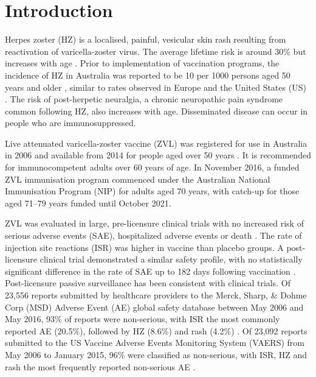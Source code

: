 \documentclass[review, endfloat]{elsarticle}
\begin{document}
\section{Introduction}

Herpes zoster (HZ) is a localised, painful, vesicular skin rash resulting from reactivation of varicella-zoster virus. The average lifetime risk is around 30\% but increases with age \citep{brisson2001epidemiology}. Prior to implementation of vaccination programs, the incidence of HZ in Australia was reported to be 10 per 1000 persons aged 50 years and older \citep{stein2009herpes}, similar to rates observed in Europe \citep{pinchinat2013similar} and the United States (US) \citep{insinga2005incidence}. The risk of post-herpetic neuralgia, a chronic neuropathic pain syndrome common following HZ, also increases with age. Disseminated disease can occur in people who are immunosuppressed. 

Live attenuated varicella-zoster vaccine (ZVL) was registered for use in Australia in 2006 and available from 2014 for people aged over 50 years \citep{yawn2007population}. It is recommended for immunocompetent adults over 60 years of age. In November 2016, a funded ZVL immunisation program commenced under the Australian National Immunisation Program (NIP) for adults aged 70 years, with catch-up for those aged 71–79 years funded until October 2021. 

ZVL was evaluated in large, pre-licensure clinical trials with no increased risk of serious adverse events (SAE), hospitalized adverse events or death \cite{oxman2005, gagliardi2016vaccines, schmader2012}. The rate of injection site reactions (ISR) was higher in vaccine than placebo groups. A post-licensure clinical trial demonstrated a similar safety profile, with no statistically significant difference in the rate of SAE up to 182 days following vaccination \citep{murray2011}. Post-licensure passive surveillance has been consistent with clinical trials. Of 23,556 reports submitted by healthcare providers to the Merck, Sharp, \& Dohme Corp (MSD) Adverse Event (AE) global safety database between May 2006 and May 2016, 93\% of reports were non-serious, with ISR the most commonly reported AE (20.5\%), followed by HZ (8.6\%) and rash (4.2\%) \citep{willis2017herpes}. Of 23,092 reports submitted to the US Vaccine Adverse Events Monitoring System (VAERS) from May 2006 to January 2015, 96\% were classified as non-serious, with ISR, HZ and rash the most frequently reported non-serious AE \citep{miller2018post}.
\end{document}
